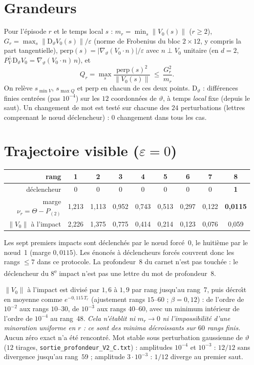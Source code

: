 \documentclass[11pt,a4paper]{article}
\theoremstyle{remark}
\newcommand{\norm}[1]{\lVert #1\rVert}
\newcommand{\vth}{\vartheta}
\newcommand{\D}{\mathrm D}
\begin{document}
\section{Grandeurs}
Pour l'\'episode $r$ et le temps local $s$ : $m_r=\min_s\norm{V_0(s)}$ ($r\ge2$), $G_r=\max_s\norm{\D_\vth V_0(s)}/\varepsilon$ (norme de Frobenius du bloc $2\times12$, y compris la part tangentielle), $\mathrm{perp}(s)=\lvert\nabla_\vth(V_0\!\cdot n)\rvert/\varepsilon$ avec $n\perp V_0$ unitaire (en $d=2$, $P^\perp_V\D_\vth V_0=\nabla_\vth(V_0\!\cdot n)\,n$), et
\[
Q_r=\max_s\frac{\mathrm{perp}(s)^2}{\norm{V_0(s)}}\ \le\ \frac{G_r^2}{m_r}.
\]
On relève $s_{\min V}$, $s_{\max Q}$ et $\mathrm{perp}$ en chacun de ces deux points. $\D_\vth$ : diff\'erences finies centr\'ees (pas $10^{-4}$) sur les $12$ coordonn\'ees de $\vth$, \`a temps \emph{local} fixe (depuis le saut). Un changement de mot est test\'e sur chacune des $24$ perturbations (lettres comprenant le n\oe ud d\'eclencheur) : $0$ changement dans tous les cas.

\section{Trajectoire visible ($\varepsilon=0$)}
\begin{center}\small
\begin{tabular}{r|cccccccc}
\toprule
rang & 1 & 2 & 3 & 4 & 5 & 6 & 7 & 8\\
\midrule
d\'eclencheur & 0&0&0&0&0&0&0&\textbf{1}\\
marge $\nu_r=\Theta-P_{(2)}$ & 1,213 & 1,113 & 0,952 & 0,743 & 0,513 & 0,297 & 0,122 & \textbf{0,0115}\\
$\norm{V_0}$ \`a l'impact & 2,226 & 1,375 & 0,775 & 0,414 & 0,214 & 0,123 & 0,076 & 0,059\\
\bottomrule
\end{tabular}
\end{center}
Les sept premiers impacts sont d\'eclench\'es par le n\oe ud forc\'e~0, le huiti\`eme par le n\oe ud~1 (marge $0{,}0115$). Les \'enonc\'es \`a d\'eclencheurs forc\'es couvrent donc les rangs $\le7$ dans ce protocole. La profondeur~8 du carnet n'est pas touch\'ee : le d\'eclencheur du 8\textsuperscript{e} impact n'est pas une lettre du mot de profondeur~8.

$\norm{V_0}$ \`a l'impact est divis\'e par $1{,}6$ \`a $1{,}9$ par rang jusqu'au rang~7, puis d\'ecro\^{\i}t en moyenne comme $e^{-0{,}115\,T_r}$ (ajustement rangs $15$--$60$ ; $\beta=0{,}12$) : de l'ordre de $10^{-2}$ aux rangs $10$--$30$, de $10^{-3}$ aux rangs $40$--$60$, avec un minimum int\'erieur de l'ordre de $10^{-4}$ au rang~48. \emph{Cela n'\'etablit ni $m_r\to0$ ni l'impossibilit\'e d'une minoration uniforme en $r$ : ce sont des minima d\'ecroissants sur $60$ rangs finis.} Aucun z\'ero exact n'a \'et\'e rencontr\'e. Mot stable sous perturbation gaussienne de $\vth$ ($12$ tirages, \texttt{sortie\_profondeur\_V2\_C.txt}) : amplitudes $10^{-4}$ et $10^{-3}$ : $12/12$ sans divergence jusqu'au rang~$59$ ; amplitude $3\cdot10^{-3}$ : $1/12$ diverge au premier saut.
\end{document}
